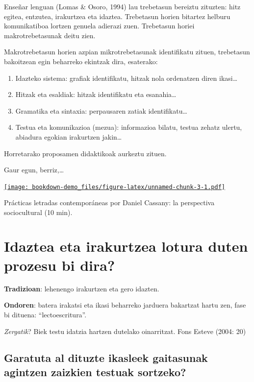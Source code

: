 \documentclass[]{book}
\providecommand{\tightlist}{%
  \setlength{\itemsep}{0pt}\setlength{\parskip}{0pt}}
\begin{document}
Enseñar lenguan (Lomas \& Osoro, 1994) lau trebetasun bereiztu zituzten: hitz egitea, entzutea, irakurtzea eta idaztea. Trebetasun horien bitartez helburu komunikatiboa lortzen genuela adierazi zuen. Trebetasun horiei makrotrebetasunak deitu zien.

Makrotrebetasun horien azpian mikrotrebetasunak identifikatu zituen, trebetasun bakoitzean egin beharreko ekintzak dira, esaterako:

\begin{enumerate}
\def\labelenumi{\arabic{enumi}.}
\tightlist
\item
  Idazteko sistema: grafiak identifikatu, hitzak nola ordenatzen diren ikasi\ldots{}
\item
  Hitzak eta esaldiak: hitzak identifikatu eta esanahia\ldots{}
\item
  Gramatika eta sintaxia: perpausaren zatiak identifikatu\ldots{}
\item
  Testua eta komunikazioa (mezua): informazioa bilatu, testua zehatz ulertu, abiadura egokian irakurtzen jakin\ldots{}
\end{enumerate}

Horretarako proposamen didaktikoak aurkeztu zituen.

Gaur egun, berriz,\ldots{}

\href{https://www.youtube.com/embed/lsHc3SWiWEQ?rel=0}{\texttt{[image: bookdown-demo\_files/figure-latex/unnamed-chunk-3-1.pdf]}}

Prácticas letradas contemporáneas por Daniel Cassany: la perspectiva sociocultural (10 min).

\hypertarget{idaztea-eta-irakurtzea-lotura-duten-prozesu-bi-dira}{%
\section{Idaztea eta irakurtzea lotura duten prozesu bi dira?}\label{idaztea-eta-irakurtzea-lotura-duten-prozesu-bi-dira}}

\textbf{Tradizioan}: lehenengo irakurtzen eta gero idazten.

\textbf{Ondoren}: batera irakatsi eta ikasi beharreko jarduera bakartzat hartu zen, fase bi dituena: ``lectoescritura''.

\emph{Zergatik}? Biek testu idatzia hartzen dutelako oinarritzat.
Fons Esteve (2004: 20)

\hypertarget{garatuta-al-dituzte-ikasleek-gaitasunak-agintzen-zaizkien-testuak-sortzeko}{%
\subsection{Garatuta al dituzte ikasleek gaitasunak agintzen zaizkien testuak sortzeko?}\label{garatuta-al-dituzte-ikasleek-gaitasunak-agintzen-zaizkien-testuak-sortzeko}}
\end{document}
